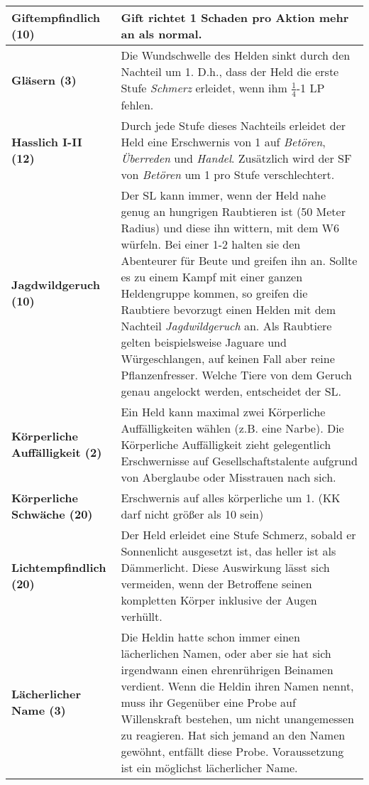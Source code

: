 \begin{longtable}{|p{5cm}|p{11cm}|}
\textbf{Giftempfindlich (10)} & Gift richtet 1 Schaden pro Aktion mehr an als normal. \\ \hline

\textbf{Gläsern (3)} & Die Wundschwelle des Helden sinkt durch den Nachteil um 1. D.h., dass der Held die erste Stufe \textit{Schmerz} erleidet, wenn ihm $\frac{1}{4}$-1 LP fehlen. \\ \hline

\textbf{Hasslich I-II (12)} & Durch jede Stufe dieses Nachteils erleidet der Held eine Erschwernis von 1 auf \textit{Betören}, \textit{Überreden} und \textit{Handel}. Zusätzlich wird der SF von \textit{Betören} um 1 pro Stufe verschlechtert. \\ \hline

\textbf{Jagdwildgeruch (10)} & Der SL kann immer, wenn der Held nahe genug an hungrigen Raubtieren ist (50 Meter Radius) und diese ihn wittern, mit dem W6 würfeln. Bei einer 1-2 halten sie den Abenteurer für Beute und greifen ihn an. Sollte es zu einem Kampf mit einer ganzen Heldengruppe kommen, so greifen die Raubtiere bevorzugt einen Helden mit dem Nachteil \textit{Jagdwildgeruch} an. Als Raubtiere gelten beispielsweise Jaguare und Würgeschlangen, auf keinen Fall aber reine Pflanzenfresser. Welche Tiere von dem Geruch genau angelockt werden, entscheidet der SL. \\ \hline

\textbf{Körperliche Auffälligkeit (2)} & Ein Held kann maximal zwei Körperliche Auffälligkeiten wählen (z.B. eine Narbe). Die Körperliche Auffälligkeit zieht gelegentlich Erschwernisse auf Gesellschaftstalente aufgrund von Aberglaube oder Misstrauen nach sich. \\ \hline

\textbf{Körperliche Schwäche (20)} & Erschwernis auf alles körperliche um 1. (KK darf nicht größer als 10 sein) \\ \hline

\textbf{Lichtempfindlich (20)} & Der Held erleidet eine Stufe Schmerz, sobald er Sonnenlicht ausgesetzt ist, das heller ist als Dämmerlicht. Diese Auswirkung lässt sich vermeiden, wenn der Betroffene seinen kompletten Körper inklusive der Augen verhüllt. \\ \hline

\textbf{Lächerlicher Name (3)} & Die Heldin hatte schon immer einen lächerlichen Namen, oder aber sie hat sich irgendwann einen  ehrenrührigen Beinamen verdient. Wenn die Heldin  ihren Namen nennt, muss ihr Gegenüber eine Probe  auf Willenskraft bestehen, um nicht unangemessen zu  reagieren. Hat sich jemand an den Namen gewöhnt,  entfällt diese Probe. Voraussetzung ist ein möglichst lächerlicher Name. \\ \hline


\end{longtable}

